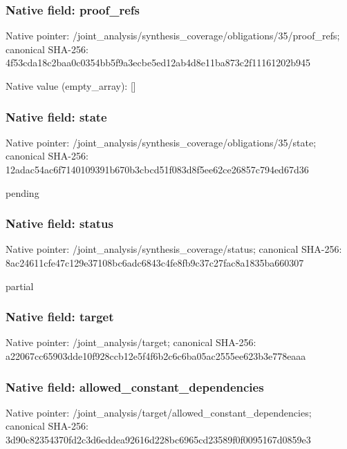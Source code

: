 \documentclass[10pt,a4paper]{article}
\begin{document}
\subsubsection{Native field: proof\_\allowbreak{}refs}
Native pointer: /joint\_\allowbreak{}analysis/synthesis\_\allowbreak{}coverage/obligations/35/proof\_\allowbreak{}refs; canonical SHA-256: 4f53cda18c2baa0c0354bb5f9a3ecbe5ed12ab4d8e11ba873c2f11161202b945

Native value (empty\_\allowbreak{}array): []

\subsubsection{Native field: state}
Native pointer: /joint\_\allowbreak{}analysis/synthesis\_\allowbreak{}coverage/obligations/35/state; canonical SHA-256: 12adac54ac6f7140109391b670b3cbcd51f083d8f5ee62ce26857c794ed67d36

\begingroup\raggedright\sloppy pending\par\endgroup

\subsubsection{Native field: status}
Native pointer: /joint\_\allowbreak{}analysis/synthesis\_\allowbreak{}coverage/status; canonical SHA-256: 8ac24611cfe47c129e37108bc6adc6843c4fe8fb9c37c27fac8a1835ba660307

\begingroup\raggedright\sloppy partial\par\endgroup

\subsubsection{Native field: target}
Native pointer: /joint\_\allowbreak{}analysis/target; canonical SHA-256: a22067cc65903dde10f928ccb12e5f4f6b2c6c6ba05ac2555ee623b3e778eaaa

\subsubsection{Native field: allowed\_\allowbreak{}constant\_\allowbreak{}dependencies}
Native pointer: /joint\_\allowbreak{}analysis/target/allowed\_\allowbreak{}constant\_\allowbreak{}dependencies; canonical SHA-256: 3d90c82354370fd2c3d6eddea92616d228bc6965cd23589f0f0095167d0859e3
\end{document}
